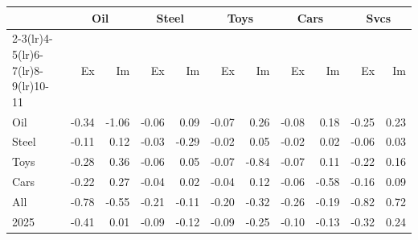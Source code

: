 \begin{tabular}{lrrrrrrrrrr}
\toprule
 & \multicolumn{2}{c}{Oil} & \multicolumn{2}{c}{Steel} & \multicolumn{2}{c}{Toys} & \multicolumn{2}{c}{Cars} & \multicolumn{2}{c}{Svcs} \\
\cmidrule(lr){2-3}\cmidrule(lr){4-5}\cmidrule(lr){6-7}\cmidrule(lr){8-9}\cmidrule(lr){10-11}
 & Ex & Im & Ex & Im & Ex & Im & Ex & Im & Ex & Im \\
\midrule
Oil & -0.34 & -1.06 & -0.06 & 0.09 & -0.07 & 0.26 & -0.08 & 0.18 & -0.25 & 0.23 \\
Steel & -0.11 & 0.12 & -0.03 & -0.29 & -0.02 & 0.05 & -0.02 & 0.02 & -0.06 & 0.03 \\
Toys & -0.28 & 0.36 & -0.06 & 0.05 & -0.07 & -0.84 & -0.07 & 0.11 & -0.22 & 0.16 \\
Cars & -0.22 & 0.27 & -0.04 & 0.02 & -0.04 & 0.12 & -0.06 & -0.58 & -0.16 & 0.09 \\
All & -0.78 & -0.55 & -0.21 & -0.11 & -0.20 & -0.32 & -0.26 & -0.19 & -0.82 & 0.72 \\
2025 & -0.41 & 0.01 & -0.09 & -0.12 & -0.09 & -0.25 & -0.10 & -0.13 & -0.32 & 0.24 \\
\bottomrule
\end{tabular}
